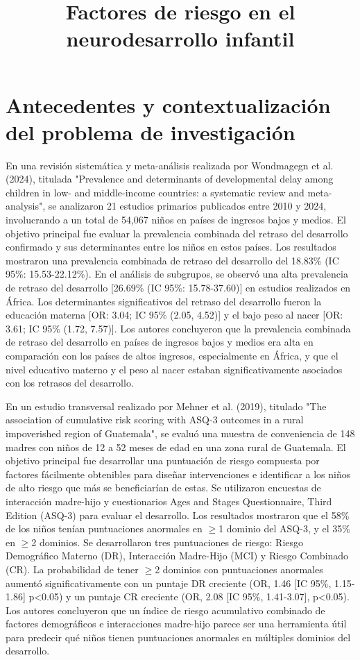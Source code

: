 \documentclass[11pt,letterpaper]{report}
\title{Factores de riesgo en el neurodesarrollo infantil}
\begin{document}
	\tableofcontents
	\maketitle
	\chapter{Antecedentes y contextualización del problema de investigación}
En una revisión sistemática y meta-análisis realizada por Wondmagegn et al.
(2024), titulada "Prevalence and determinants of developmental delay among
children in low- and middle-income countries: a systematic review and
meta-analysis", se analizaron 21 estudios primarios publicados entre 2010 y
2024, involucrando a un total de 54,067 niños en países de ingresos bajos y
medios. El objetivo principal fue evaluar la prevalencia combinada del retraso
del desarrollo confirmado y sus determinantes entre los niños en estos países.
Los resultados mostraron una prevalencia combinada de retraso del desarrollo
del 18.83\% (IC 95\%: 15.53-22.12\%). En el análisis de subgrupos, se observó
una alta prevalencia de retraso del desarrollo [26.69\% (IC 95\%: 15.78-37.60)]
en estudios realizados en África. Los determinantes significativos del retraso
del desarrollo fueron la educación materna [OR: 3.04; IC 95\% (2.05, 4.52)] y
el bajo peso al nacer [OR: 3.61; IC 95\% (1.72, 7.57)]. Los autores concluyeron
que la prevalencia combinada de retraso del desarrollo en países de ingresos
bajos y medios era alta en comparación con los países de altos ingresos,
especialmente en África, y que el nivel educativo materno y el peso al nacer
estaban significativamente asociados con los retrasos del desarrollo.
\cite{Wondmagegn2024}

En un estudio transversal realizado por Mehner et al. (2019), titulado "The
association of cumulative risk scoring with ASQ-3 outcomes in a rural
impoverished region of Guatemala", se evaluó una muestra de conveniencia de 148
madres con niños de 12 a 52 meses de edad en una zona rural de Guatemala. El
objetivo principal fue desarrollar una puntuación de riesgo compuesta por
factores fácilmente obtenibles para diseñar intervenciones e identificar a los
niños de alto riesgo que más se beneficiarían de estas. Se utilizaron encuestas
de interacción madre-hijo y cuestionarios Ages and Stages Questionnaire, Third
Edition (ASQ-3) para evaluar el desarrollo. Los resultados mostraron que el 
58\% de los niños tenían puntuaciones anormales en $\ge$1 dominio del ASQ-3, y
el 35\% en $\ge$2 dominios. Se desarrollaron tres puntuaciones de riesgo:
Riesgo Demográfico Materno (DR), Interacción Madre-Hijo (MCI) y Riesgo
Combinado (CR). La probabilidad de tener $\ge$2 dominios con puntuaciones
anormales aumentó significativamente con un puntaje DR creciente (OR, 1.46 [IC
95\%, 1.15-1.86] p<0.05) y un puntaje CR creciente (OR, 2.08 [IC 95\%,
1.41-3.07], p<0.05). Los autores concluyeron que un índice de riesgo
acumulativo combinado de factores demográficos e interacciones madre-hijo
parece ser una herramienta útil para predecir qué niños tienen puntuaciones
anormales en múltiples dominios del desarrollo. \cite{CMehner2019}
\end{document}
